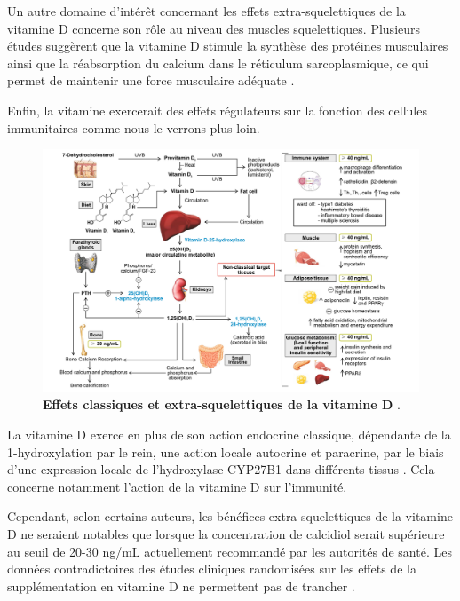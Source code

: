 \documentclass[
  a4paper,
  DIV=11,
  numbers=noendperiod,
  listof=totoc]{scrreprt}
\begin{document}
Un autre domaine d'intérêt concernant les effets extra-squelettiques de
la vitamine D concerne son rôle au niveau des muscles squelettiques.
Plusieurs études suggèrent que la vitamine D stimule la synthèse des
protéines musculaires ainsi que la réabsorption du calcium dans le
réticulum sarcoplasmique, ce qui permet de maintenir une force
musculaire adéquate \autocite{Caprio.2017}.

Enfin, la vitamine exercerait des effets régulateurs sur la fonction des
cellules immunitaires comme nous le verrons plus loin.

\begin{landscape}
\begin{figure}
\includegraphics{figures/extra-skeletal-effect.png} 
\caption[Effets classiques et extra-squelettiques de la vitamine D.]
{\textbf{Effets classiques et extra-squelettiques de la vitamine D} \autocite{Caprio.2017}.}
\label{fig:extra-skeletal}
\end{figure}
\end{landscape}

La vitamine D exerce en plus de son action endocrine classique,
dépendante de la 1-hydroxylation par le rein, une action locale
autocrine et paracrine, par le biais d'une expression locale de
l'hydroxylase \ac{CYP27B1} dans différents tissus
\autocite{Carmeliet.2015,Cannell.2008}. Cela concerne notamment l'action
de la vitamine D sur l'immunité.

Cependant, selon certains auteurs, les bénéfices extra-squelettiques de
la vitamine D ne seraient notables que lorsque la concentration de
calcidiol serait supérieure au seuil de 20-30 ng/mL actuellement
recommandé par les autorités de santé. Les données contradictoires des
études cliniques randomisées sur les effets de la supplémentation en
vitamine D ne permettent pas de trancher
\autocite{Caprio.2017,Lewis.2015,Bouillon.2013,Rejnmark.2017}.
\end{document}
